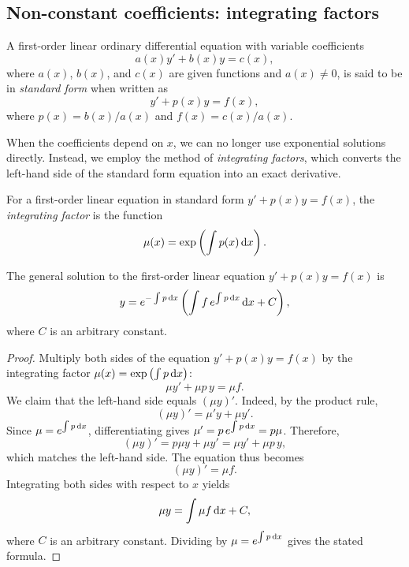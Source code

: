\documentclass[a4paper]{article}
\begin{document}
\subsection{Non-constant coefficients: integrating factors}
\begin{defi}
  A first-order linear ordinary differential equation with variable coefficients
  \[
    a(x)y' + b(x)y = c(x),
  \]
  where $a(x)$, $b(x)$, and $c(x)$ are given functions and $a(x) \neq 0$, is said to be in \emph{standard form} when written as
  \[
    y' + p(x) y = f(x),
  \]
  where $p(x) = b(x)/a(x)$ and $f(x) = c(x)/a(x)$.
\end{defi}

\begin{remark}
  When the coefficients depend on $x$, we can no longer use exponential solutions directly. Instead, we employ the method of \emph{integrating factors}, which converts the left-hand side of the standard form equation into an exact derivative.
\end{remark}

\begin{defi}
  For a first-order linear equation in standard form $y' + p(x)y = f(x)$, the \emph{integrating factor} is the function
  \[
    \mu(x) = \exp\left(\int p(x)\,\mathrm{d} x\right).
  \]
\end{defi}

\begin{prop}\label{prop:integrating-factor}
  The general solution to the first-order linear equation $y' + p(x)y = f(x)$ is
  \[
    y = e^{-\int p\,\mathrm{d} x}\left(\int f\, e^{\int p\,\mathrm{d} x}\,\mathrm{d} x + C\right),
  \]
  where $C$ is an arbitrary constant.
\end{prop}
\begin{proof}
  Multiply both sides of the equation $y' + p(x)y = f(x)$ by the integrating factor $\mu(x) = \exp\left(\int p\,\mathrm{d} x\right)$:
  \[
    \mu y' + \mu p\, y = \mu f.
  \]
  We claim that the left-hand side equals $(\mu y)'$. Indeed, by the product rule,
  \[
    (\mu y)' = \mu' y + \mu y'.
  \]
  Since $\mu = e^{\int p\,\mathrm{d} x}$, differentiating gives $\mu' = p\,e^{\int p\,\mathrm{d} x} = p\mu$. Therefore,
  \[
    (\mu y)' = p\mu y + \mu y' = \mu y' + \mu p\, y,
  \]
  which matches the left-hand side. The equation thus becomes
  \[
    (\mu y)' = \mu f.
  \]
  Integrating both sides with respect to $x$ yields
  \[
    \mu y = \int \mu f\,\mathrm{d} x + C,
  \]
  where $C$ is an arbitrary constant. Dividing by $\mu = e^{\int p\,\mathrm{d} x}$ gives the stated formula.
\end{proof}
\end{document}
